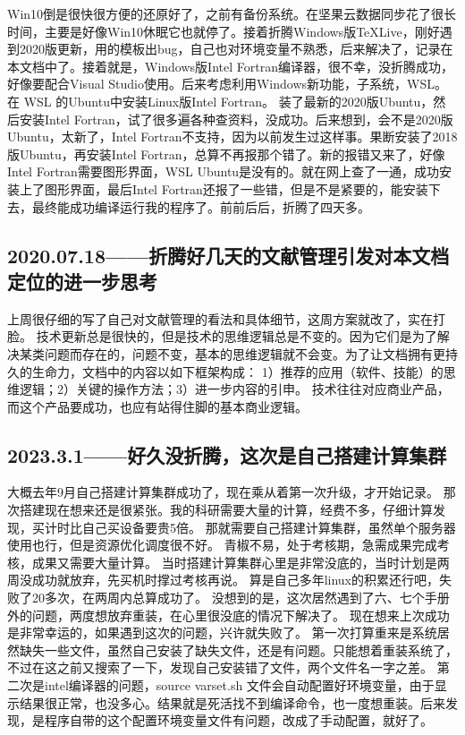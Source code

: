 \documentclass[cn,11pt,chinese,twoside]{elegantbook}
\begin{document}
Win10倒是很快很方便的还原好了，之前有备份系统。在坚果云数据同步花了很长时间，主要是好像Win10休眠它也就停了。接着折腾Windows版\TeX Live，刚好遇到2020版更新，用的模板出bug，自己也对环境变量不熟悉，后来解决了，记录在本文档中了。接着就是，Windows版Intel Fortran编译器，很不幸，没折腾成功，好像要配合Visual Studio使用。后来考虑利用Windows新功能，子系统，WSL。在 WSL 的Ubuntu中安装Linux版Intel Fortran。 装了最新的2020版Ubuntu，然后安装Intel Fortran，试了很多遍各种查资料，没成功。后来想到，会不是2020版Ubuntu，太新了，Intel Fortran不支持，因为以前发生过这样事。果断安装了2018版Ubuntu，再安装Intel Fortran，总算不再报那个错了。新的报错又来了，好像Intel Fortran需要图形界面，WSL Ubuntu是没有的。就在网上查了一通，成功安装上了图形界面，最后Intel Fortran还报了一些错，但是不是紧要的，能安装下去，最终能成功编译运行我的程序了。前前后后，折腾了四天多。




\subsection*{2020.07.18——折腾好几天的文献管理引发对本文档定位的进一步思考}
上周很仔细的写了自己对文献管理的看法和具体细节，这周方案就改了，实在打脸。
技术更新总是很快的，但是技术的思维逻辑总是不变的。因为它们是为了解决某类问题而存在的，问题不变，基本的思维逻辑就不会变。为了让文档拥有更持久的生命力，文档中的内容以如下框架构成：
1）推荐的应用（软件、技能）的思维逻辑；2）关键的操作方法；3）进一步内容的引申。
技术往往对应商业产品，而这个产品要成功，也应有站得住脚的基本商业逻辑。




\subsection*{2023.3.1——好久没折腾，这次是自己搭建计算集群}
大概去年9月自己搭建计算集群成功了，现在乘从着第一次升级，才开始记录。
那次搭建现在想来还是很紧张。我的科研需要大量的计算，经费不多，仔细计算发现，买计时比自己买设备要贵5倍。
那就需要自己搭建计算集群，虽然单个服务器使用也行，但是资源优化调度很不好。
青椒不易，处于考核期，急需成果完成考核，成果又需要大量计算。
当时搭建计算集群心里是非常没底的，当时计划是两周没成功就放弃，先买机时撑过考核再说。
算是自己多年linux的积累还行吧，失败了20多次，在两周内总算成功了。
没想到的是，这次居然遇到了六、七个手册外的问题，两度想放弃重装，在心里很没底的情况下解决了。
现在想来上次成功是非常幸运的，如果遇到这次的问题，兴许就失败了。
第一次打算重来是系统居然缺失一些文件，虽然自己安装了缺失文件，还是有问题。只能想着重装系统了，不过在这之前又搜索了一下，发现自己安装错了文件，两个文件名一字之差。
第二次是intel编译器的问题，source varset.sh 文件会自动配置好环境变量，由于显示结果很正常，也没多心。结果就是死活找不到编译命令，也一度想重装。后来发现，是程序自带的这个配置环境变量文件有问题，改成了手动配置，就好了。
\end{document}
